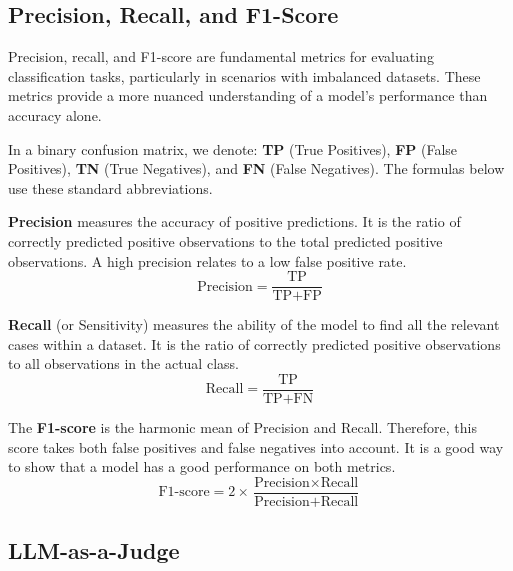             \subsection{Precision, Recall, and F1-Score} \label{sec:precision_recall_f1_review}
            Precision, recall, and F1-score are fundamental metrics for evaluating classification tasks, particularly in scenarios with imbalanced datasets. These metrics provide a more nuanced understanding of a model's performance than accuracy alone.

            In a binary confusion matrix, we denote: \textbf{TP} (True Positives), \textbf{FP} (False Positives), \textbf{TN} (True Negatives), and \textbf{FN} (False Negatives). The formulas below use these standard abbreviations.

                \textbf{Precision} measures the accuracy of positive predictions. It is the ratio of correctly predicted positive observations to the total predicted positive observations. A high precision relates to a low false positive rate.
                \begin{equation}
                    \text{Precision} = \frac{\text{TP}}{\text{TP} + \text{FP}}
                    \label{eq:precision}
                \end{equation}

                \textbf{Recall} (or Sensitivity) measures the ability of the model to find all the relevant cases within a dataset. It is the ratio of correctly predicted positive observations to all observations in the actual class.
                \begin{equation}
                    \text{Recall} = \frac{\text{TP}}{\text{TP} + \text{FN}}
                    \label{eq:recall}
                \end{equation}

                The \textbf{F1-score} is the harmonic mean of Precision and Recall. Therefore, this score takes both false positives and false negatives into account. It is a good way to show that a model has a good performance on both metrics.
                \begin{equation}
                    \text{F1-score} = 2 \times \frac{\text{Precision} \times \text{Recall}}{\text{Precision} + \text{Recall}}
                    \label{eq:f1-score}
                \end{equation}


        \subsection{LLM-as-a-Judge}

